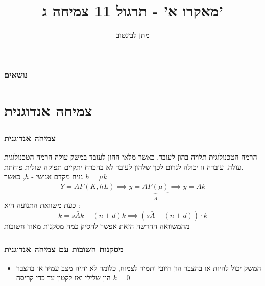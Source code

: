\documentclass[usenames,dvipsnames]{beamer}
\title{מאקרו א' - תרגול 11 צמיחה ג'}
\author{\texthebrew{ מתן לבינטוב}}
\institute[{{ אב"ג}}]{{ אוניברסיטת בן גוריון בנגב}}
\date{}
\begin{document}
\begin{RTL}
\begin{frame}
\titlepage
\end{frame}

\begin{frame}
    \frametitle{נושאים}
    \tableofcontents
\end{frame}

\section{צמיחה אנדוגנית}
\begin{frame}[allowframebreaks]
    \frametitle{צמיחה אנדוגנית}
    הרמה הטכנולוגית תלויה בהון לעובד, כאשר מלאי ההון לעובד במשק עולה הרמה
    הטכנולוגית עולה. עובדה זו יכולה לגרום לכך שלהון לעובד לא בהכרח יתקיים תפוקה
    שולית פוחתת.
    \\
    נניח מקדם אנושי - $h$, כאשר $h = \mu k $
    $$Y = AF\left(K,hL\right) \implies y = \underbrace{AF\left(\mu\right)}_{\bar A} \implies y =\bar A k$$
    כעת משוואת התנועה היא : 
    $$\dot k = s\bar A k - \left(n+d\right) k \implies \left(s \bar A - (n+d)\right)\cdot k$$
    מהמשוואה החדשה הזאת אפשר להסיק כמה מסקנות מאוד חשובות
    

\end{frame}

\begin{frame}[allowframebreaks]
    \frametitle{מסקנות חשובות עם צמיחה אנדוגנית}
    \begin{itemize}
        \item המשק יכול להיות או בהצבר הון חיובי ותמיד לצמוח, כלומר לא יהיה מצב עמיד או בהצבר הון שלילי ואז לקטון עד כדי קריסה $k=0$
        


\end{itemize}
\end{frame}
\end{RTL}
\end{document}
